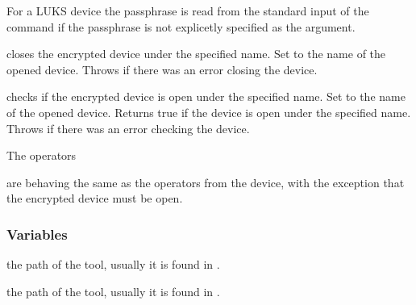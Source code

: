 For a LUKS device the passphrase is read from the standard input of the command
if the passphrase is not explicetly specified as the  argument.

closes the encrypted device under the specified name.
Set  to the name of the opened device.
Throws  if there was an error closing the device.

checks if the encrypted device is open under the specified name.
Set  to the name of the opened device.
Returns true if the device is open under the specified name.
Throws  if there was an error checking the device.

The operators 
\begin{inparaitem}
\item {}
\item {}
\item {}
\item {}
\item {}
\item {}
\item {}
\item {}
\item {}
\item {}
\item {}
\item {}
\end{inparaitem}
are behaving the same as the operators from the  device,
with the exception that the encrypted device must be open.

\subsubsection*{Variables}

 the path of the  tool, usually it is 
found in .

 the path of the  tool, usually it is 
found in .

